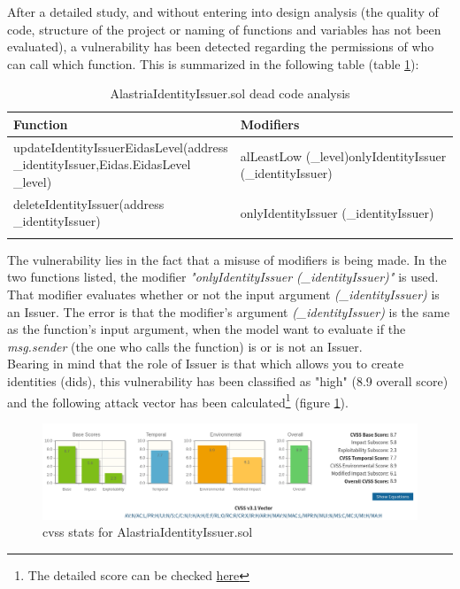 \documentclass[a4paper, 12pt]{article} %
\begin{document}
            After a detailed study, and without entering into design analysis (the quality of code, structure of the project or naming of functions and variables has not been evaluated), a vulnerability has been detected regarding the permissions of who can call which function. This is summarized in the following table (table \ref{tab:dead-code-issuer}):
            \newpage
            \begin{longtable}{||p{0.5\linewidth} | p{0.5\linewidth}||}
                \hline
                \textbf{Function}  & \textbf{Modifiers}\\ [0.5ex] 
                \hline\hline
                updateIdentityIssuerEidasLevel\newline (address \_identityIssuer,\newline Eidas.EidasLevel \_level) & alLeastLow (\_level)\newline onlyIdentityIssuer (\_identityIssuer)\\ 
                \hline
                deleteIdentityIssuer\newline (address \_identityIssuer) & onlyIdentityIssuer (\_identityIssuer)\\[1ex] 
                \hline
                \caption{AlastriaIdentityIssuer.sol dead code analysis}
                \label{tab:dead-code-issuer}
            \end{longtable}
            The vulnerability lies in the fact that a misuse of modifiers is being made.  In the two functions listed, the modifier \textit{"onlyIdentityIssuer (\_identityIssuer)"} is used. That modifier evaluates whether or not the input argument \textit{(\_identityIssuer)} is an Issuer. The error is that the modifier's argument \textit{(\_identityIssuer)} is the same as the function's input argument, when the model want to evaluate if the \textit{msg.sender} (the one who calls the function) is or is not an Issuer.\\
            
            Bearing in mind that the role of Issuer is that which allows you to create identities (\acrshort{did}s), this vulnerability has been classified as "high" (8.9 overall score) and the following attack vector has been calculated\footnote{The detailed score can be checked \href{https://nvd.nist.gov/vuln-metrics/cvss/v3-calculator?vector=AV:N/AC:L/PR:H/UI:N/S:C/C:N/I:H/A:H/E:F/RL:O/RC:R/CR:X/IR:H/AR:H/MAV:N/MAC:L/MPR:N/MUI:N/MS:C/MC:X/MI:H/MA:H&version=3.1}{here}} (figure \ref{fig:stats-aii}).\\
            \begin{figure}[h]
                \centering
                \includegraphics[width=1.1\textwidth]{stats-aii.png}
                \caption{\acrshort{cvss} stats for AlastriaIdentityIssuer.sol}
                \label{fig:stats-aii}
            \end{figure}
            
\end{document}
